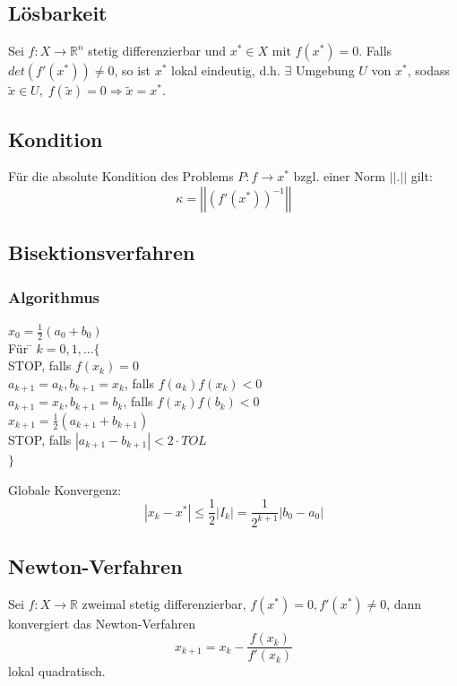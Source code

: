 \documentclass[4pt,a4paper]{scrartcl}
\begin{document}
\begin{multicols}{4}
\subsection{Lösbarkeit}
Sei $f:X\rightarrow\mathbb{R}^n$ stetig differenzierbar und $x^*\in X$ mit $f(x^*)=0$. Falls $det(f'(x^*))\neq 0$, so ist $x^*$ lokal eindeutig, d.h. $\exists$ Umgebung $U$ von $x^*$, sodass $\tilde{x}\in U,\;f(\tilde{x})=0\Rightarrow\tilde{x}=x^*$.

\subsection{Kondition}
Für die absolute Kondition des Problems $P:f\rightarrow x^*$ bzgl. einer Norm $||.||$ gilt:
\begin{equation*}
\kappa=\left|\left|\left(f'(x^*)\right)^{-1}\right|\right|
\end{equation*}

\subsection{Bisektionsverfahren}

\subsubsection{Algorithmus}
\begin{tabbing}
$x_0=\frac{1}{2}(a_0+b_0)$\\
Für \= $k=0,1,...\{$\\
\>STOP, falls $f(x_k)=0$\\
\>$a_{k+1}=a_k,b_{k+1}=x_k$, falls $f(a_k)f(x_k)<0$\\
\>$a_{k+1}=x_k,b_{k+1}=b_k$, falls $f(x_k)f(b_k)<0$\\
\>$x_{k+1}=\frac{1}{2}(a_{k+1}+b_{k+1})$\\
\>STOP, falls $|a_{k+1}-b_{k+1}|<2\cdot TOL$\\
$\}$
\end{tabbing}
Globale Konvergenz:
\begin{equation*}
|x_k-x^*|\leq\frac{1}{2}|I_k|=\frac{1}{2^{k+1}}|b_0-a_0|
\end{equation*}

\subsection{Newton-Verfahren}
Sei $f:X\rightarrow\mathbb{R}$ zweimal stetig differenzierbar, $f(x^*)=0,f'(x^*)\neq 0$, dann konvergiert das Newton-Verfahren
\begin{equation*}
x_{k+1}=x_k-\frac{f(x_k)}{f'(x_k)}
\end{equation*}
lokal quadratisch.


\end{multicols}
\end{document}
